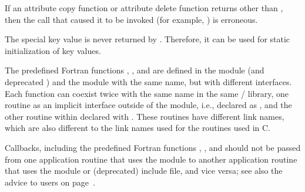 %

If an attribute copy function or attribute delete function returns other than
, then the call that caused it to be invoked (for example,
) is erroneous.


The special key value  is never returned
by . Therefore, it can be used for
static initialization of key values.

\begin{implementors}
\label{advice:context:predefined:Fortran:implementors}%
The predefined Fortran functions ,
,
and \vlgb{} are defined
in the  module (and deprecated \gb{}) and the  module
with the same name, but with different interfaces.
Each function can coexist twice with the same name in the same \MPI/ library,
one routine as an implicit interface outside of the  module,
i.e., declared as ,
and the other routine within  declared with .
These routines have different link names, which are also different
to the link names used for the routines used in C.
\end{implementors}

\begin{users}
\label{advice:context:predefined:Fortran:users}%
Callbacks, including the predefined Fortran functions
, ,
and \vlgb{} should not be passed from one application
routine that uses the  module to another
application routine that uses the  module or (deprecated)  include file,
and vice versa;
see also the advice to users on page~\pageref{advice:bindings:predefined:Fortran:users}.
\end{users}

